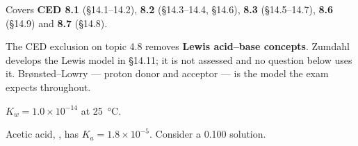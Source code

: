 \documentclass{apchem-exam}
\begin{document}
\apctitleblock

\begin{apcnote}
Covers \textbf{CED 8.1} (\S14.1--14.2), \textbf{8.2} (\S14.3--14.4,
\S14.6), \textbf{8.3} (\S14.5--14.7), \textbf{8.6} (\S14.9) and
\textbf{8.7} (\S14.8).

The CED exclusion on topic 4.8 removes \textbf{Lewis acid--base
concepts}. Zumdahl develops the Lewis model in \S14.11; it is not
assessed and no question below uses it. Br\o{}nsted--Lowry --- proton
donor and acceptor --- is the model the exam expects throughout.

$K_w = 1.0\times10^{-14}$ at \SI{25}{\celsius}.
\end{apcnote}



Acetic acid, , has $K_a = 1.8\times10^{-5}$. Consider a
\SI{0.100}{\Molar} solution.
\end{document}
